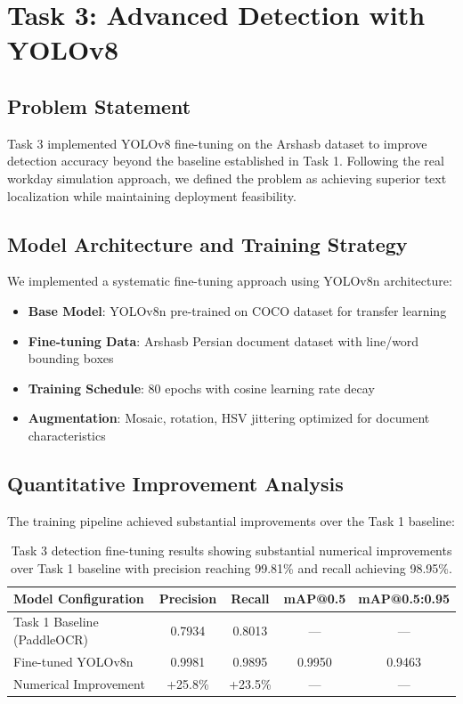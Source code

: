 \documentclass[11pt,a4paper]{article}
\begin{document}
\section{Task 3: Advanced Detection with YOLOv8}

\subsection{Problem Statement}
Task 3 implemented YOLOv8 fine-tuning on the Arshasb dataset to improve detection accuracy beyond the baseline established in Task 1. Following the real workday simulation approach, we defined the problem as achieving superior text localization while maintaining deployment feasibility.

\subsection{Model Architecture and Training Strategy}
We implemented a systematic fine-tuning approach using YOLOv8n architecture:
\begin{itemize}
  \item \textbf{Base Model}: YOLOv8n pre-trained on COCO dataset for transfer learning
  \item \textbf{Fine-tuning Data}: Arshasb Persian document dataset with line/word bounding boxes
  \item \textbf{Training Schedule}: 80 epochs with cosine learning rate decay
  \item \textbf{Augmentation}: Mosaic, rotation, HSV jittering optimized for document characteristics
\end{itemize}

\subsection{Quantitative Improvement Analysis}
The training pipeline achieved substantial improvements over the Task 1 baseline:

\begin{table}[h]
  \centering
  \begin{tabular*}{\textwidth}{@{\extracolsep{\fill}}lcccc@{}}
    \toprule
    Model Configuration & Precision & Recall & mAP@0.5 & mAP@0.5:0.95 \\
    \midrule
    Task 1 Baseline (PaddleOCR) & 0.7934 & 0.8013 & --- & --- \\
    Fine-tuned YOLOv8n & 0.9981 & 0.9895 & 0.9950 & 0.9463 \\
    Numerical Improvement & +25.8\% & +23.5\% & --- & --- \\
    \bottomrule
  \end{tabular*}
  \caption{Task 3 detection fine-tuning results showing substantial numerical improvements over Task 1 baseline with precision reaching 99.81\% and recall achieving 98.95\%.}
  \label{tab:task3-improved}
\end{table}
\end{document}
